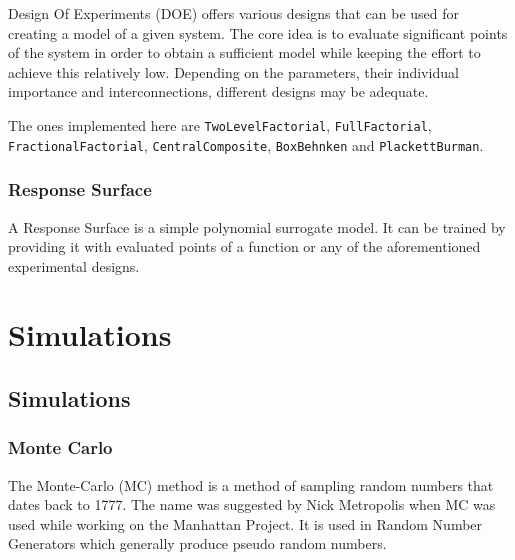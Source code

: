 \label{5141534247305030192}{}


Design Of Experiments (DOE) offers various designs that can be used for creating a model of a given system. The core idea is to evaluate significant points of the system in order to obtain a sufficient model while keeping the effort to achieve this relatively low. Depending on the parameters, their individual importance and interconnections, different designs may be adequate.



The ones implemented here are \texttt{TwoLevelFactorial}, \texttt{FullFactorial}, \texttt{FractionalFactorial}, \texttt{CentralComposite}, \texttt{BoxBehnken} and \texttt{PlackettBurman}.



\subsection{Response Surface}



\label{11236368157692582757}{}


A Response Surface is a simple polynomial surrogate model. It can be trained by providing it with evaluated points of a function or any of the aforementioned experimental designs.



\chapter{Simulations}


\section{Simulations}



\label{782416527003373519}{}


\subsection{Monte Carlo}



\label{16647002951547067847}{}


The Monte-Carlo (MC) method is a method of sampling random numbers that dates back to 1777. The name was suggested by Nick Metropolis when MC was used while working on the Manhattan Project. It is used in Random Number Generators which generally produce pseudo random numbers.



